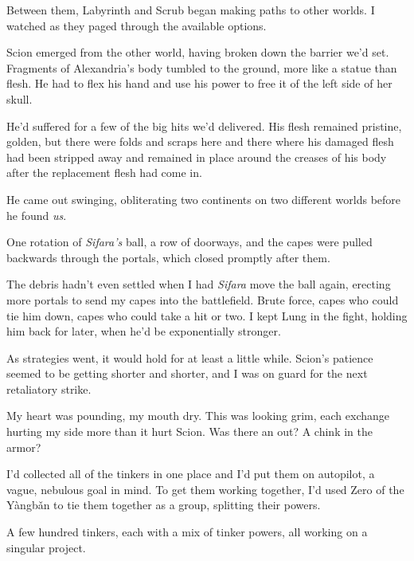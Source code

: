 Between them, Labyrinth and Scrub began making paths to other worlds.  I watched as they paged through the available options.



Scion emerged from the other world, having broken down the barrier we'd set.  Fragments of Alexandria's body tumbled to the ground, more like a statue than flesh.  He had to flex his hand and use his power to free it of the left side of her skull.



He'd suffered for a few of the big hits we'd delivered.  His flesh remained pristine, golden, but there were folds and scraps here and there where his damaged flesh had been stripped away and remained in place around the creases of his body after the replacement flesh had come in.



He came out swinging, obliterating two continents on two different worlds before he found \emph{us}.



One rotation of \emph{Sifara's} ball, a row of doorways, and the capes were pulled backwards through the portals, which closed promptly after them.



The debris hadn't even settled when I had \emph{Sifara} move the ball again, erecting more portals to send my capes into the battlefield.  Brute force, capes who could tie him down, capes who could take a hit or two.  I kept Lung in the fight, holding him back for later, when he'd be exponentially stronger.



As strategies went, it would hold for at least a little while.  Scion's patience seemed to be getting shorter and shorter, and I was on guard for the next retaliatory strike.



My heart was pounding, my mouth dry.  This was looking grim, each exchange hurting my side more than it hurt Scion.  Was there an out?  A chink in the armor?



I'd collected all of the tinkers in one place and I'd put them on autopilot, a vague, nebulous goal in mind.  To get them working together, I'd used Zero of the Y\`{a}ngb\v{a}n to tie them together as a group, splitting their powers.



A few hundred tinkers, each with a mix of tinker powers, all working on a singular project.



